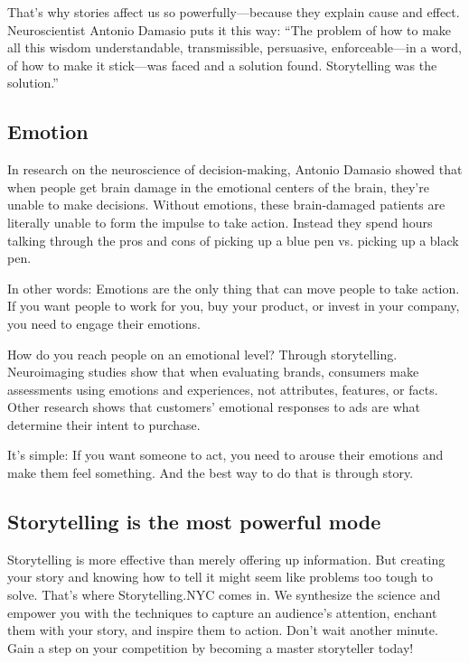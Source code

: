 \documentclass[12pt]{article}
\begin{document}
That's why stories affect us so powerfully---because they explain cause and effect. Neuroscientist Antonio Damasio puts it this way: ``The problem of how to make all this wisdom understandable, transmissible, persuasive, enforceable---in a word, of how to make it stick---was faced and a solution found. Storytelling was the solution.''

\subsection{Emotion}
\label{sec:org2642544}

In research on the neuroscience of decision-making, Antonio Damasio showed that when people get brain damage in the emotional centers of the brain, they're unable to make decisions. Without emotions, these brain-damaged patients are literally unable to form the impulse to take action. Instead they spend hours talking through the pros and cons of picking up a blue pen vs. picking up a black pen.

In other words: Emotions are the only thing that can move people to take action. If you want people to work for you, buy your product, or invest in your company, you need to engage their emotions.

How do you reach people on an emotional level? Through storytelling. Neuroimaging studies show that when evaluating brands, consumers make assessments using emotions and experiences, not attributes, features, or facts. Other research shows that customers' emotional responses to ads are what determine their intent to purchase.

It's simple: If you want someone to act, you need to arouse their emotions and make them feel something. And the best way to do that is through story.

\subsection{Storytelling is the most powerful mode}
\label{sec:org8362357}

Storytelling is more effective than merely offering up information. But creating your story and knowing how to tell it might seem like problems too tough to solve. That's where Storytelling.NYC comes in. We synthesize the science and empower you with the techniques to capture an audience's attention, enchant them with your story, and inspire them to action. Don't wait another minute. Gain a step on your competition by becoming a master storyteller today!
\end{document}
